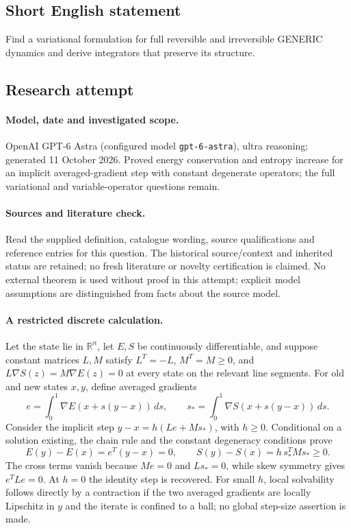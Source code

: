 \documentclass[11pt]{article}
\begin{document}
\subsection{Short English statement}
Find a variational formulation for full reversible and irreversible GENERIC dynamics and derive integrators that preserve its structure.
\subsection{Research attempt}
\paragraph{Model, date and investigated scope.}
OpenAI GPT-6 Astra (configured model \texttt{gpt-6-astra}), ultra reasoning; generated 11 October 2026. Proved energy conservation and entropy increase for an implicit averaged-gradient step with constant degenerate operators; the full variational and variable-operator questions remain.

\paragraph{Sources and literature check.}
Read the supplied definition, catalogue wording, source qualifications and reference entries for this question. The historical source/context and inherited status are retained; no fresh literature or novelty certification is claimed. No external theorem is used without proof in this attempt; explicit model assumptions are distinguished from facts about the source model.

\paragraph{A restricted discrete calculation.} Let the state lie in \(\mathbb R^n\), let \(E,S\) be continuously differentiable, and suppose constant matrices \(L,M\) satisfy \(L^T=-L\), \(M^T=M\ge0\), and \(L\nabla S(z)=M\nabla E(z)=0\) at every state on the relevant line segments. For old and new states \(x,y\), define averaged gradients
\[
 e=\int_0^1\nabla E(x+s(y-x))\,ds,\qquad
 s_*=\int_0^1\nabla S(x+s(y-x))\,ds.
\]
Consider the implicit step \(y-x=h(Le+Ms_*)\), with \(h\ge0\). Conditional on a solution existing, the chain rule and the constant degeneracy conditions prove
\[
 E(y)-E(x)=e^T(y-x)=0,\qquad
 S(y)-S(x)=h\,s_*^TMs_*\ge0.
\]
The cross terms vanish because \(Me=0\) and \(Ls_*=0\), while skew symmetry gives \(e^TLe=0\). At \(h=0\) the identity step is recovered. For small \(h\), local solvability follows directly by a contraction if the two averaged gradients are locally Lipschitz in \(y\) and the iterate is confined to a ball; no global step-size assertion is made.
\end{document}
